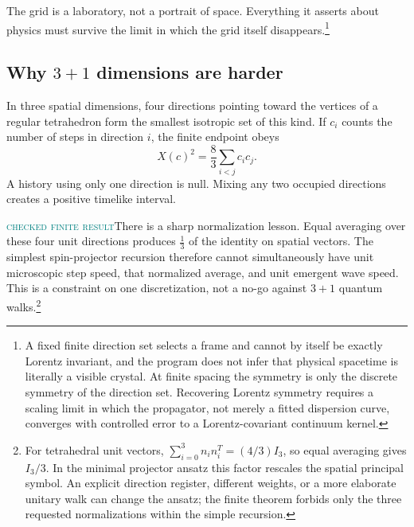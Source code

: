 \documentclass[11pt]{article}
\newcommand{\Mlabel}{\textcolor{teal}{\textsc{checked finite result}}}
\begin{document}
The grid is a laboratory, not a portrait of space.  Everything it asserts
about physics must survive the limit in which the grid itself
disappears.\footnote{A fixed finite direction set selects a frame and cannot
by itself be exactly Lorentz invariant, and the program does not infer that
physical spacetime is literally a visible crystal.  At finite spacing the
symmetry is only the discrete symmetry of the direction set.  Recovering
Lorentz symmetry requires a scaling limit in which the propagator, not merely
a fitted dispersion curve, converges with controlled error to a
Lorentz-covariant continuum kernel.}

\subsection*{Why $3+1$ dimensions are harder}

In three spatial dimensions, four directions pointing toward the vertices of a
regular tetrahedron form the smallest isotropic set of this kind.  If $c_i$
counts the number of steps in direction $i$, the finite endpoint obeys
\[
  X(c)^2=\frac{8}{3}\sum_{i<j}c_i c_j.
\]
A history using only one direction is null.  Mixing any two occupied directions
creates a positive timelike interval.

\begin{center}
\end{center}

\Mlabel\quad There is a sharp normalization lesson.  Equal averaging over
these four unit
directions produces $\tfrac13$ of the identity on spatial vectors.  The simplest
spin-projector recursion therefore cannot simultaneously have unit microscopic
step speed, that normalized average, and unit emergent wave speed.  This is a
constraint on one discretization, not a no-go against $3+1$ quantum
walks.\footnote{For tetrahedral unit vectors,
$\sum_{i=0}^{3}n_i n_i^T=(4/3)I_3$, so equal averaging gives $I_3/3$.  In the
minimal projector ansatz this factor rescales the spatial principal symbol.
An explicit direction register, different weights, or a more elaborate unitary
walk can change the ansatz; the finite theorem forbids only the three requested
normalizations within the simple recursion.}
\end{document}
